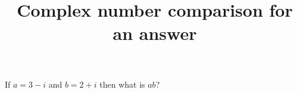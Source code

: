 \documentclass[hidesidemenu]{webquiz}
\title{Complex number comparison for an answer}
\begin{document}
  \begin{question}     %
     If $a=3-i$ and $b=2+i$ then what is $ab$?
  \end{question}
\end{document}
